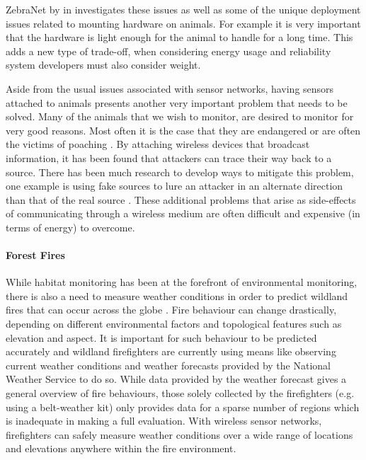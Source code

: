 ZebraNet by \citeauthor{Juang:2002:ECW:635508.605408} in \cite{Juang:2002:ECW:635508.605408} investigates these issues as well as some of the unique deployment issues related to mounting hardware on animals. For example it is very important that the hardware is light enough for the animal to handle for a long time. This adds a new type of trade-off, when considering energy usage and reliability system developers must also consider weight.

Aside from the usual issues associated with sensor networks, having sensors attached to animals presents another very important problem that needs to be solved. Many of the animals that we wish to monitor, are desired to monitor for very good reasons. Most often it is the case that they are endangered or are often the victims of poaching \cite{6115161,Biagioni02theapplication}. By attaching wireless devices that broadcast information, it has been found that attackers can trace their way back to a source. There has been much research to develop ways to mitigate this problem, one example is using fake sources to lure an attacker in an alternate direction than that of the real source \cite{Ozturk:2004:SPE:1029102.1029117,Kamat.1437121,6296046}. These additional problems that arise as side-effects of communicating through a wireless medium are often difficult and expensive (in terms of energy) to overcome.

\paragraph{Forest Fires} While habitat monitoring has been at the forefront of environmental monitoring, there is also a need to measure weather conditions in order to predict wildland fires that can occur across the globe \cite{libeliumForestFires,FireWxNet,4428702}. Fire behaviour can change drastically, depending on different environmental factors and topological features such as elevation and aspect. It is important for such behaviour to be predicted accurately and wildland firefighters are currently using means like observing current weather conditions and weather forecasts provided by the National Weather Service to do so. While data provided by the weather forecast gives a general overview of fire behaviours, those solely collected by the firefighters (e.g. using a belt-weather kit) only provides data for a sparse number of regions which is inadequate in making a full evaluation. With wireless sensor networks, firefighters can safely measure weather conditions over a wide range of locations and elevations anywhere within the fire environment.

